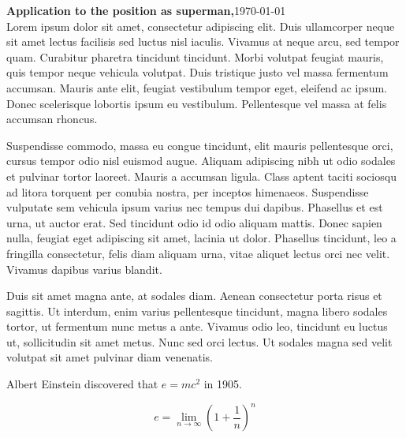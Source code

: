  
\nopagenumbers{}

\usepackage{setspace}
\onehalfspacing

\addtolength{\topmargin}{-.8in}


 	\maketitle
	        \vspace{-10mm}
	        \textbf{Application to the position as superman,}\hfill \today
                \vspace{3mm}\\
	Lorem ipsum dolor sit amet, consectetur adipiscing elit. Duis ullamcorper neque sit amet lectus facilisis sed luctus nisl iaculis. Vivamus at neque arcu, sed tempor quam. Curabitur pharetra tincidunt tincidunt. Morbi volutpat feugiat mauris, quis tempor neque vehicula volutpat. Duis tristique justo vel massa fermentum accumsan. Mauris ante elit, feugiat vestibulum tempor eget, eleifend ac ipsum. Donec scelerisque lobortis ipsum eu vestibulum. Pellentesque vel massa at felis accumsan rhoncus.

	Suspendisse commodo, massa eu congue tincidunt, elit mauris pellentesque orci, cursus tempor odio nisl euismod augue. Aliquam adipiscing nibh ut odio sodales et pulvinar tortor laoreet. Mauris a accumsan ligula. Class aptent taciti sociosqu ad litora torquent per conubia nostra, per inceptos himenaeos. Suspendisse vulputate sem vehicula ipsum varius nec tempus dui dapibus. Phasellus et est urna, ut auctor erat. Sed tincidunt odio id odio aliquam mattis. Donec sapien nulla, feugiat eget adipiscing sit amet, lacinia ut dolor. Phasellus tincidunt, leo a fringilla consectetur, felis diam aliquam urna, vitae aliquet lectus orci nec velit. Vivamus dapibus varius blandit.

	Duis sit amet magna ante, at sodales diam. Aenean consectetur porta risus et sagittis. Ut interdum, enim varius pellentesque tincidunt, magna libero sodales tortor, ut fermentum nunc metus a ante. Vivamus odio leo, tincidunt eu luctus ut, sollicitudin sit amet metus. Nunc sed orci lectus. Ut sodales magna sed velit volutpat sit amet pulvinar diam venenatis.

	Albert Einstein discovered that $e=mc^2$ in 1905.

	\[ e=\lim_{n \to \infty} \left(1+\frac{1}{n}\right)^n \]

